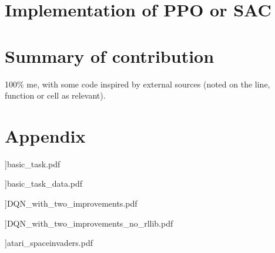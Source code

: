 \documentclass[a4pape, 11pt, english]{article}
\begin{document}
\section{Implementation of PPO or SAC}

\section{Summary of contribution}
100\% me, with some code inspired by external sources (noted on the line, function or cell as relevant).



\section{Appendix}

]{basic_task.pdf}


]{basic_task_data.pdf}



]{DQN_with_two_improvements.pdf}


]{DQN_with_two_improvements_no_rllib.pdf}


]{atari_spaceinvaders.pdf}
\end{document}
